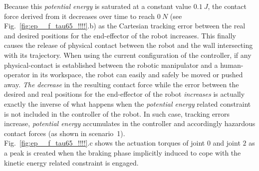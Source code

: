 Because this \textit{potential energy} is saturated at a constant value $0.1~J$, the contact force derived from it decreases over time to reach $0~N$ (see Fig.~\ref{fig:ep__f_tau65_!!!!}.b) as the Cartesian tracking error between the real and desired positions for the end-effector of the robot increases. This finally causes the release of physical contact between the robot and the wall intersecting with its trajectory. When using the current configuration of the controller, if any physical-contact is established between the robotic manipulator and a human-operator in its workspace, the robot can easily and safely be moved or pushed away. \textit{The decrease} in the resulting contact force while the error between the desired and real positions for the end-effector of the robot \textit{increases} is actually exactly the inverse of what happens when the \textit{potential energy} related constraint is not included in the controller of the robot. In such case, tracking errors increase, \textit{potential energy} accumulates in the controller and accordingly hazardous contact forces (as shown in scenario~1).\\ Fig.~\ref{fig:ep__f_tau65_!!!!}.c shows the actuation torques of joint $0$ and joint $2$ as a peak is created when the braking phase implicitly induced to cope with the kinetic energy related constraint is engaged. 
